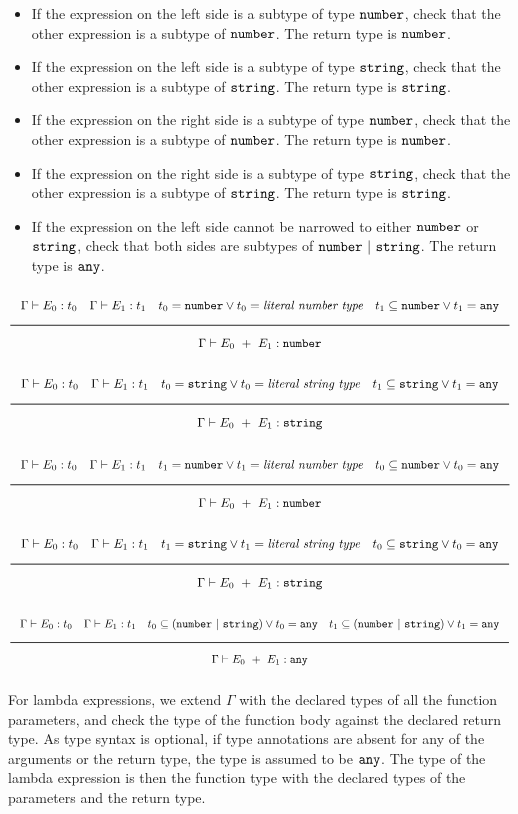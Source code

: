\begin{itemize}
\item{If the expression on the left side is a subtype of type $\texttt{number}$,
  check that the other expression is a subtype of $\texttt{number}$. The return type is $\texttt{number}$.}
\item{If the expression on the left side is a subtype of type $\texttt{string}$,
  check that the other expression is a subtype of $\texttt{string}$. The return type is $\texttt{string}$.}
\item{If the expression on the right side is a subtype of type $\texttt{number}$,
  check that the other expression is a subtype of $\texttt{number}$. The return type is $\texttt{number}$.}
\item{If the expression on the right side is a subtype of type $\texttt{string}$,
  check that the other expression is a subtype of $\texttt{string}$. The return type is $\texttt{string}$.}
\item{If the expression on the left side cannot be narrowed to either $\texttt{number}$ or $\texttt{string}$, check that both sides are subtypes of 
  $\texttt{number}\ |\ \texttt{string}$. The return type is $\texttt{any}$.}
\end{itemize}

\noindent
\[
  \Rule{\Gamma \vdash E_0 : t_0 \quad \Gamma \vdash E_1 : t_1 \quad t_0 = \Number \vee t_0 = \textit{literal number type}
    \quad t_1 \subseteq \Number \vee t_1 = \Any}{\Gamma \vdash E_0\ + \ E_1 : \Number}
\]
\noindent
\[
  \Rule{\Gamma \vdash E_0 : t_0 \quad \Gamma \vdash E_1 : t_1 \quad t_0 = \String \vee t_0 = \textit{literal string type}
    \quad t_1 \subseteq \String \vee t_1 = \Any}{\Gamma \vdash E_0\ + \ E_1 : \String}
\]
\noindent
\[
  \Rule{\Gamma \vdash E_0 : t_0 \quad \Gamma \vdash E_1 : t_1 \quad t_1 = \Number \vee t_1 = \textit{literal number type}
    \quad t_0 \subseteq \Number \vee t_0 = \Any}{\Gamma \vdash E_0\ + \ E_1 : \Number}
\]
\noindent
\[
  \Rule{\Gamma \vdash E_0 : t_0 \quad \Gamma \vdash E_1 : t_1 \quad t_1 = \String \vee t_1 = \textit{literal string type}
    \quad t_0 \subseteq \String \vee t_0 = \Any}{\Gamma \vdash E_0\ + \ E_1 : \String}
\]
\noindent
\[
  \Rule{\Gamma \vdash E_0 : t_0 \quad \Gamma \vdash E_1 : t_1 \quad t_0 \subseteq (\Number\ |\ \String) \vee t_0 = \Any
    \quad t_1 \subseteq (\Number\ |\ \String) \vee t_1 = \Any}{\Gamma \vdash E_0\ + \ E_1 : \Any}
\]
\noindent

For lambda expressions, we extend $\Gamma$ with the declared types of all the function parameters,
and check the type of the function body against the declared return type.
As type syntax is optional, if type annotations are absent for any of the arguments or the return type, the type is assumed to be $\texttt{any}$.
The type of the lambda expression is then the function type with the declared types of the parameters and the return type. 

